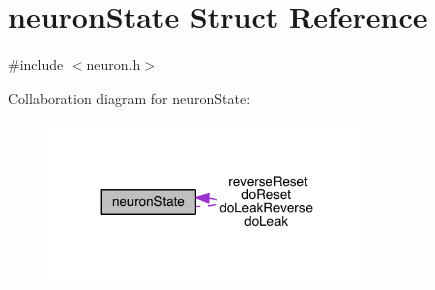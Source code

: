 \hypertarget{structneuron_state}{}\section{neuron\+State Struct Reference}
\label{structneuron_state}


{\ttfamily \#include $<$neuron.\+h$>$}



Collaboration diagram for neuron\+State\+:
\nopagebreak
\begin{figure}[H]
\begin{center}
\leavevmode
\includegraphics[width=239pt]{structneuron_state__coll__graph}
\end{center}
\end{figure}
